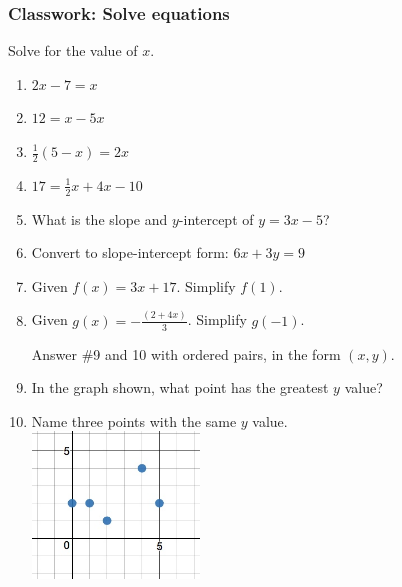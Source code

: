 \documentclass[12pt, oneside]{article}
\begin{document}
\subsubsection*{Classwork: Solve equations}
  \vspace{0.5cm}

Solve for the value of $x$.

\begin{enumerate}

  \item   $2x-7=x$ \vspace{3cm}
  \item   $12=x-5x$ \vspace{3cm}
  \item   $\frac{1}{2}(5-x)=2x$ \vspace{4cm}
  \item   $17=\frac{1}{2}x+4x-10$ \vspace{5cm}

  \item   What is the slope and $y$-intercept of $y=3x-5$?
    \vspace{2cm}
  \item   Convert to slope-intercept form: $6x+3y=9$ \vspace{3cm}

  \item Given $f(x)=3x+17$. Simplify $f(1)$. \vspace{3cm}
  \item Given $\displaystyle g(x)=-\frac{(2+4x)}{3}$. Simplify $g(-1)$.  \vspace{3cm}

  Answer \#9 and 10 with ordered pairs, in the form $(x, y)$.
  \item In the graph shown, what point has the greatest $y$ value? \vspace{1cm}
  \item Name three points with the same $y$ value.\\
      \includegraphics[width=0.35\textwidth]{discrete-domain-graph.jpeg}

\newpage

\end{enumerate}
\end{document}
